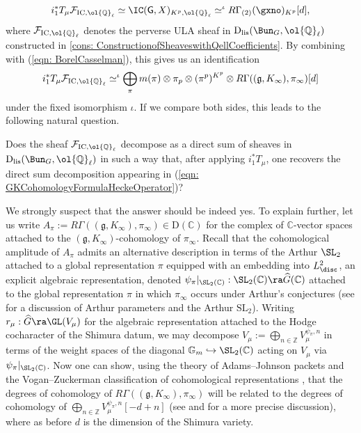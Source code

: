 \documentclass[letterpaper,11pt]{amsart}
\begin{document}
{\[ 
 i_{1}^{*}T_{\mu}\mathcal{F}_{\mathrm{IC},\ol{\mathbb{Q}}_{\ell}} \simeq \IC(\mathsf{G},X)_{K^{p},\ol{\mathbb{Q}}_{\ell}} \simeq^{\iota}  R\Gamma_{(2)}(\gxno)_{K^{p}}[d], 
\]
where $\mathcal{F}_{\mathrm{IC},\ol{\mathbb{Q}}_{\ell}}$ denotes the perverse ULA sheaf in $\mathrm{D}_{\mathrm{lis}}(\Bun_{G},\ol{\mathbb{Q}}_{\ell})$ constructed in \ref{cons: ConstructionofSheaveswithQellCoefficients}. By combining with (\ref{eqn: BorelCasselman}), this gives us an identification
\begin{equation}{\label{eqn: GKCohomologyFormulaHeckeOperator}}
  i_{1}^{*}T_{\mu}\mathcal{F}_{\mathrm{IC},\ol{\mathbb{Q}}_{\ell}}\simeq^{\iota} \bigoplus_{\pi} m(\pi) \otimes \pi_{p} \otimes (\pi^{p})^{K^{p}} \otimes R\Gamma((\mathfrak{g},K_{\infty}),\pi_{\infty})[d] 
\end{equation}
under the fixed isomorphism $\iota$. If we compare both sides, this leads to the following natural question.
\begin{question}
Does the sheaf $\mathcal{F}_{\mathrm{IC},\ol{\mathbb{Q}}_{\ell}}$ decompose as a direct sum of sheaves in $\mathrm{D}_{\mathrm{lis}}(\Bun_{G},\ol{\mathbb{Q}}_{\ell})$ in such a way that, after applying $i_{1}^{*}T_{\mu}$, one recovers the direct sum decomposition appearing in (\ref{eqn: GKCohomologyFormulaHeckeOperator})?
\end{question}

We strongly suspect that the answer should be indeed yes. To explain further, let us write $A_{\pi} := R\Gamma((\mathfrak{g},K_{\infty}),\pi_{\infty}) \in \mathrm{D}(\mathbb{C})$ for the complex of $\mathbb{C}$-vector spaces attached to the $(\mathfrak{g},K_{\infty})$-cohomology of $\pi_{\infty}$. Recall that the cohomological amplitude of $A_{\pi}$ admits an alternative description in terms of the Arthur $\SL_{2}$ attached to a global representation $\pi$ equipped with an embedding into $L^{2}_{\disc}$, an explicit algebraic representation, denoted $\psi_{\pi}|_{\SL_{2}(\mathbb{C})}: \SL_{2}(\mathbb{C}) \ra \widehat{G}(\mathbb{C})$ attached to the global representation $\pi$ in which $\pi_{\infty}$ occurs under Arthur's conjectures (see \cite[Section~2]{KoshikawaShin} for a discussion of Arthur parameters and the Arthur $\mathrm{SL}_2$). Writing $r_{\mu}: \widehat{G} \ra \GL(V_{\mu})$ for the algebraic representation attached to the Hodge cocharacter of the Shimura datum, we may decompose $V_{\mu} := \bigoplus_{n \in \mathbb{Z}} V_{\mu}^{\psi_{\pi},n}$ in terms of the weight spaces of the diagonal $\mathbb{G}_{m} \hookrightarrow \SL_{2}(\mathbb{C})$ acting on $V_{\mu}$ via $\psi_{\pi}|_{\SL_{2}(\mathbb{C})}$. Now one can show, using the theory of Adams--Johnson packets \cite{AdamsJohnson} and the Vogan--Zuckerman classification of cohomological representations \cite{VoganZuckerman}, that the degrees of cohomology of $R\Gamma((\mathfrak{g},K_{\infty}),\pi_{\infty})$ will be related to the degrees of cohomology of $\bigoplus_{n \in \mathbb{Z}} V_{\mu}^{\psi_{\pi},n}[-d+n]$ (see \cite[Proposition~6.1.4]{KoshikawaShin} and \cite[Proposition~9.1]{ArthurUnipotentConjectures} for a more precise discussion), where as before $d$ is the dimension of the Shimura variety. 

}
\end{document}
